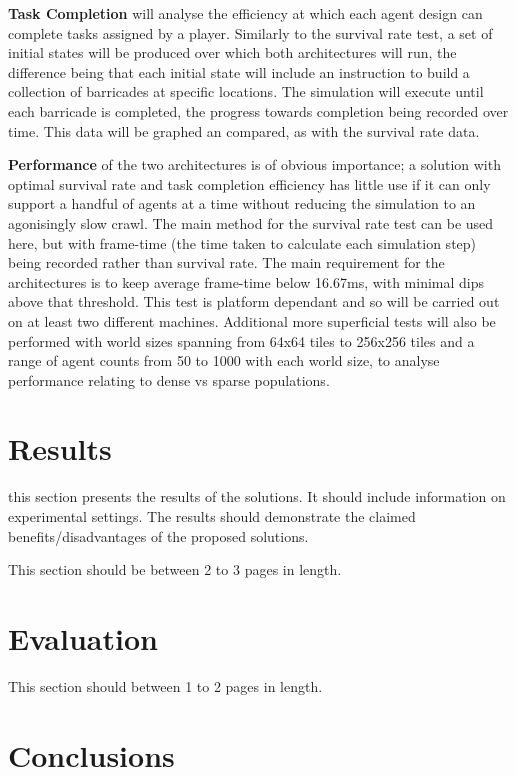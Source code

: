 \documentclass[12pt,a4paper]{article}
\begin{document}
\textbf{Task Completion} will analyse the efficiency at which each agent design can complete tasks assigned by a player. Similarly to the survival rate test, a set of initial states will be produced over which both architectures will run, the difference being that each initial state will include an instruction to build a collection of barricades at specific locations. The simulation will execute until each barricade is completed, the progress towards completion being recorded over time. This data will be graphed an compared, as with the survival rate data.

\textbf{Performance} of the two architectures is of obvious importance; a solution with optimal survival rate and task completion efficiency has little use if it can only support a handful of agents at a time without reducing the simulation to an agonisingly slow crawl. The main method for the survival rate test can be used here, but with frame-time (the time taken to calculate each simulation step) being recorded rather than survival rate. The main requirement for the architectures is to keep average frame-time below 16.67ms, with minimal dips above that threshold. This test is platform dependant and so will be carried out on at least two different machines. Additional more superficial tests will also be performed with world sizes spanning from 64x64 tiles to 256x256 tiles and a range of agent counts from 50 to 1000 with each world size, to analyse performance relating to dense vs sparse populations.

\section{Results}

this section presents the results of the solutions.  It should include information on experimental settings.  The results should demonstrate the claimed benefits/disadvantages of the proposed solutions.

This section should be between 2 to 3 pages in length.

\section{Evaluation}

This section should between 1 to 2 pages in length.

\section{Conclusions}
\end{document}
